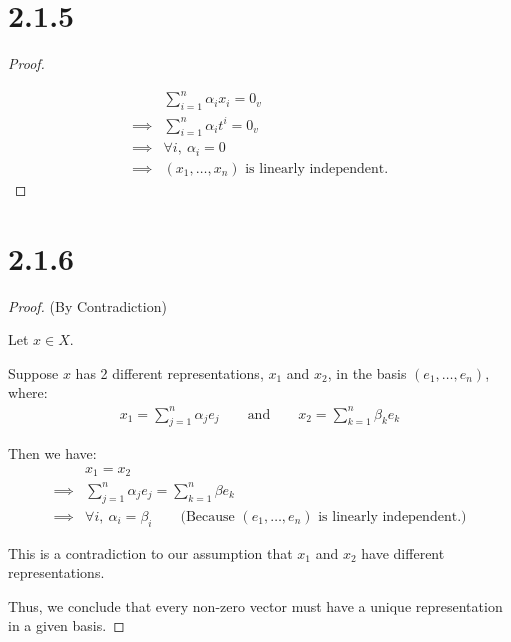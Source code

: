 \documentclass{article}
\begin{document}
\newpage

\section*{2.1.5}
\begin{proof}
  $ $

  \begin{align*}
    &\sum_{i = 1}^{n} \alpha_i x_i 
    = 0_v \\
    \implies& \sum_{i = 1}^{n} \alpha_i t^i 
    = 0_v \\
    \implies& \forall i, \: \alpha_i = 0 \\
    \implies& (x_1, \ldots, x_n) \text{ is linearly independent.}
  \end{align*}

\end{proof}

\section*{2.1.6}
\begin{proof}(By Contradiction)
  $ $

  Let $x \in X$.

  Suppose $x$ has 2 different representations, $x_1$ and $x_2$, in the basis $(e_1,\ldots,e_n)$, where:
  \begin{align*}
    x_1 = \sum_{j = 1}^{n} \alpha_j e_j \qquad \text{and} \qquad
    x_2 = \sum_{k = 1}^{n} \beta_k e_k
  \end{align*}

  Then we have:
  \begin{align*}
    &x_1 = x_2 \\
    \implies& \sum_{j = 1}^{n} \alpha_j e_j = \sum_{k = 1}^{n} \beta e_k \\
    \implies& \forall i, \: \alpha_i = \beta_i
    \qquad \text{(Because } (e_1,\ldots,e_n) \text{ is linearly independent.)}
  \end{align*}

  This is a contradiction to our assumption that $x_1$ and $x_2$ have different representations. 
  
  Thus, we conclude that every non-zero vector must have a unique representation in a given basis.

\end{proof}
\end{document}
